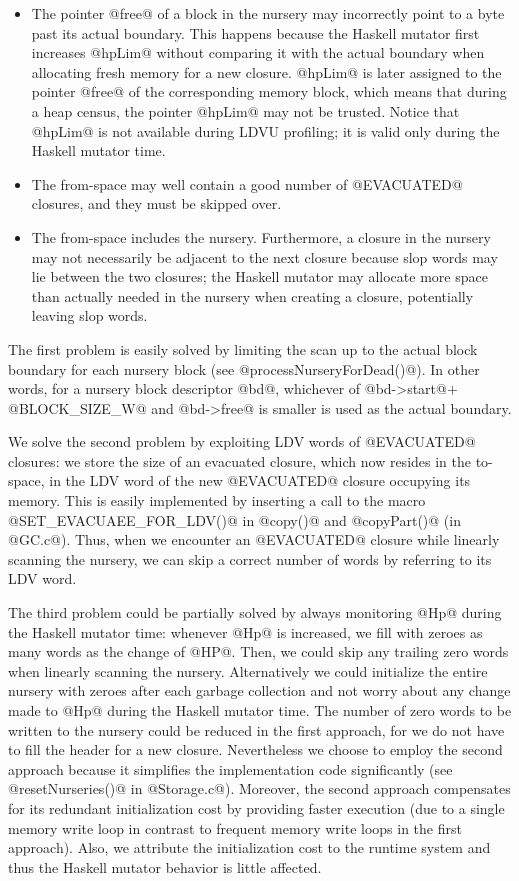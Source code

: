 \documentclass{article}
\begin{document}
\begin{itemize}
\item The pointer @free@ of a block in the nursery may incorrectly point to
a byte past its actual boundary.
This happens because 
the Haskell mutator first increases @hpLim@ without comparing it with the
actual boundary when allocating fresh memory for a new closure.
@hpLim@ is later assigned to the pointer @free@ of the corresponding memory
block, which means that during a heap census, the pointer @hpLim@ may not
be trusted. 
Notice that @hpLim@ is not available during LDVU profiling; it is valid
only during the Haskell mutator time.

\item The from-space may well contain a good number of @EVACUATED@ closures,
and they must be skipped over.

\item The from-space includes the nursery. 
Furthermore, a closure in the nursery may not necessarily be adjacent to the next 
closure because slop words may lie between the two closures;
the Haskell mutator may allocate more space than actually needed in the
nursery when creating a closure, potentially leaving slop words. 
\end{itemize}

The first problem is easily solved by limiting the scan up to the
actual block boundary for each nursery block (see
@processNurseryForDead()@).  In other words, for a nursery block
descriptor @bd@, whichever of @bd->start@$ + $@BLOCK_SIZE_W@ and
@bd->free@ is smaller is used as the actual boundary.

We solve the second problem by exploiting LDV words of @EVACUATED@
closures: we store the size of an evacuated closure, which now resides
in the to-space, in the LDV word of the new @EVACUATED@ closure
occupying its memory.  This is easily implemented by inserting a call
to the macro @SET_EVACUAEE_FOR_LDV()@ in @copy()@ and @copyPart()@ (in
@GC.c@).  Thus, when we encounter an @EVACUATED@ closure while
linearly scanning the nursery, we can skip a correct number of words
by referring to its LDV word.

The third problem could be partially solved by always monitoring @Hp@
during the Haskell mutator time: whenever @Hp@ is increased, we fill
with zeroes as many words as the change of @HP@. Then, we could skip
any trailing zero words when linearly scanning the nursery.
Alternatively we could initialize the entire nursery with zeroes after
each garbage collection and not worry about any change made to @Hp@
during the Haskell mutator time.  The number of zero words to be
written to the nursery could be reduced in the first approach, for we
do not have to fill the header for a new closure.  Nevertheless we
choose to employ the second approach because it simplifies the
implementation code significantly (see @resetNurseries()@ in
@Storage.c@).  Moreover, the second approach compensates for its
redundant initialization cost by providing faster execution (due to a
single memory write loop in contrast to frequent memory write loops in
the first approach).  Also, we attribute the initialization cost to
the runtime system and thus the Haskell mutator behavior is little
affected.
\end{document}
